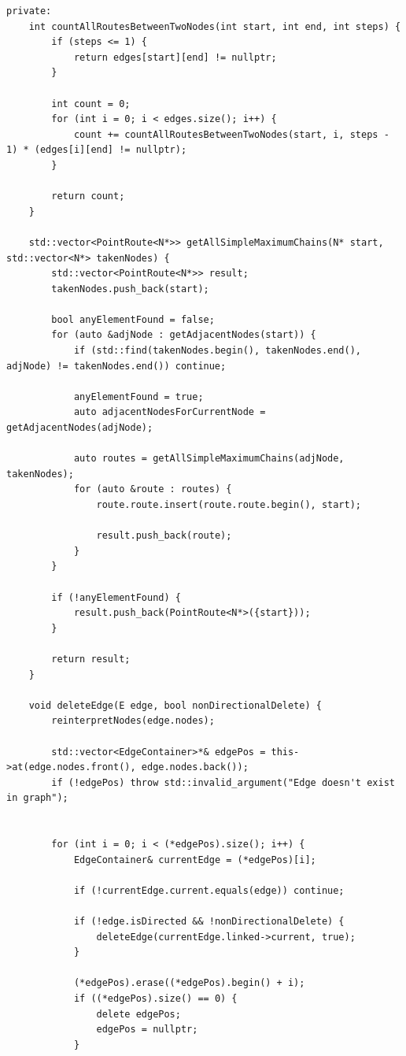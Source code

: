 \documentclass[a4paper,14pt]{extarticle}
\begin{document}
\begin{enumerate}[1.]
\begin{verbatim}
private:
    int countAllRoutesBetweenTwoNodes(int start, int end, int steps) {
        if (steps <= 1) {
            return edges[start][end] != nullptr;
        }

        int count = 0;
        for (int i = 0; i < edges.size(); i++) {
            count += countAllRoutesBetweenTwoNodes(start, i, steps - 1) * (edges[i][end] != nullptr);
        }

        return count;
    }

    std::vector<PointRoute<N*>> getAllSimpleMaximumChains(N* start, std::vector<N*> takenNodes) {
        std::vector<PointRoute<N*>> result;
        takenNodes.push_back(start);

        bool anyElementFound = false;
        for (auto &adjNode : getAdjacentNodes(start)) {
            if (std::find(takenNodes.begin(), takenNodes.end(), adjNode) != takenNodes.end()) continue;
 
            anyElementFound = true;
            auto adjacentNodesForCurrentNode = getAdjacentNodes(adjNode);
            
            auto routes = getAllSimpleMaximumChains(adjNode, takenNodes);
            for (auto &route : routes) {
                route.route.insert(route.route.begin(), start);

                result.push_back(route);
            }
        }

        if (!anyElementFound) {
            result.push_back(PointRoute<N*>({start}));
        }

        return result;
    }

    void deleteEdge(E edge, bool nonDirectionalDelete) {
        reinterpretNodes(edge.nodes);

        std::vector<EdgeContainer>*& edgePos = this->at(edge.nodes.front(), edge.nodes.back());
        if (!edgePos) throw std::invalid_argument("Edge doesn't exist in graph");
        
        
        for (int i = 0; i < (*edgePos).size(); i++) {
            EdgeContainer& currentEdge = (*edgePos)[i];

            if (!currentEdge.current.equals(edge)) continue;

            if (!edge.isDirected && !nonDirectionalDelete) {
                deleteEdge(currentEdge.linked->current, true);
            }

            (*edgePos).erase((*edgePos).begin() + i);
            if ((*edgePos).size() == 0) {
                delete edgePos;
                edgePos = nullptr;
            }


\end{verbatim}
\end{enumerate}
\end{document}
